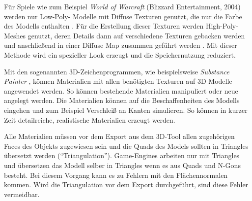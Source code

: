 \enlargethispage{10.5pt}
\par
Für Spiele wie zum Beispiel \textit{World of Warcraft} (Blizzard Entertainment, 2004) werden nur Low-Poly- Modelle mit Diffuse Texturen genutzt, die nur die Farbe des Modells enthalten \parencite{WoW}. Für die Erstellung dieser Texturen werden High-Poly-Meshes genutzt, deren Details dann auf verschiedene Texturen gebacken werden und anschließend in einer Diffuse Map zusammen geführt werden \parencite{WoW}. Mit dieser Methode wird ein spezieller Look erzeugt und die Speichernutzung reduziert.
\par
Mit den sogenannten 3D-Zeichenprogrammen, wie beispielsweise \textit{Substance Painter} , können Materialien mit allen benötigten Texturen auf 3D Modelle angewendet werden. So können bestehende Materialien manipuliert oder neue angelegt werden. Die Materialien können auf die Beschaffenheiten des Modells eingehen und zum Beispiel Verschleiß an Kanten simulieren. So können in kurzer Zeit detailreiche, realistische Materialien erzeugt werden.
\par
Alle Materialien müssen vor dem Export aus dem 3D-Tool allen zugehörigen Faces des Objekts zugewiesen sein und die Quads des Models sollten in Triangles übersetzt werden (\enquote{Triangulation}). Game-Engines arbeiten nur mit Triangles und übersetzen das Modell selber in Triangles wenn es aus Quads und N-Gons besteht. Bei diesem Vorgang kann es zu Fehlern mit den Flächennormalen kommen. Wird die Triangulation vor dem Export durchgeführt, sind diese Fehler vermeidbar.
